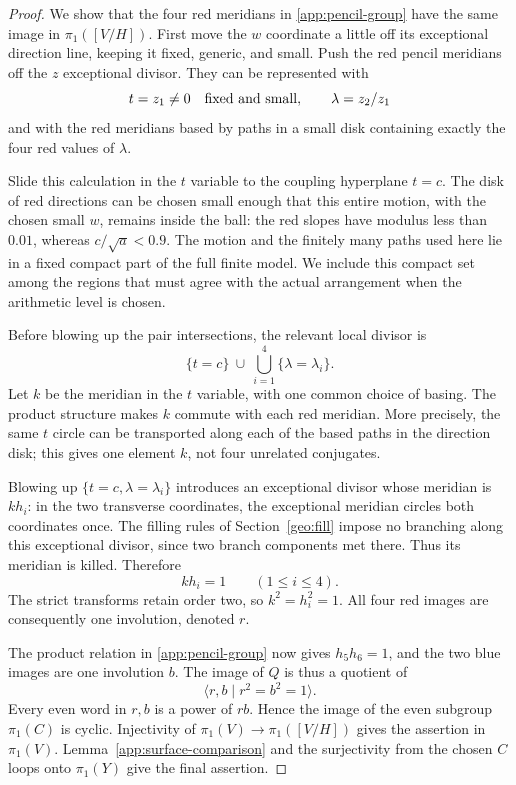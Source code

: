 \begin{proof}
We show that the four red meridians in \eqref{app:pencil-group} have
the same image in $\pi_1([V/H])$.  First move the $w$ coordinate a little
off its exceptional direction line, keeping it fixed, generic, and
small.  Push the red pencil meridians off the $z$ exceptional divisor.
They can be represented with
\[
 t=z_1\ne0\quad\hbox{fixed and small},\qquad
 \lambda=z_2/z_1
\]
and with the red meridians based by paths in a small disk containing
exactly the four red values of $\lambda$.

Slide this calculation in the $t$ variable to the coupling hyperplane
$t=c$.  The disk of red directions can be chosen small enough that
this entire motion, with the chosen small $w$, remains inside the
ball: the red slopes have modulus less than $0.01$, whereas
$c/\sqrt a<0.9$.  The motion and the finitely many paths used here lie
in a fixed compact part of the full finite model.  We include this
compact set among the regions that must agree with the actual
arrangement when the arithmetic level is chosen.

Before blowing up the pair intersections, the relevant local divisor
is
\[
 \{t=c\}\ \cup\ \bigcup_{i=1}^4\{\lambda=\lambda_i\}.
\]
Let $k$ be the meridian in the $t$ variable, with one common choice of
basing.  The product structure makes $k$ commute with each red
meridian.  More precisely, the same $t$ circle can be transported along
each of the based paths in the direction disk; this gives one element
$k$, not four unrelated conjugates.

Blowing up $\{t=c,\lambda=\lambda_i\}$ introduces an exceptional
divisor whose meridian is $kh_i$: in the two transverse coordinates,
the exceptional meridian circles both coordinates once.  The filling
rules of Section~\ref{geo:fill} impose no branching along this
exceptional divisor, since two branch components met there.  Thus its
meridian is killed.  Therefore
\[
 kh_i=1\qquad(1\le i\le4).
\]
The strict transforms retain order two, so $k^2=h_i^2=1$.  All four
red images are consequently one involution, denoted $r$.

The product relation in \eqref{app:pencil-group} now gives
$h_5h_6=1$, and the two blue images are one involution $b$.  The image
of $Q$ is thus a quotient of
\[
 \langle r,b\mid r^2=b^2=1\rangle.
\]
Every even word in $r,b$ is a power of $rb$.  Hence the image of the
even subgroup $\pi_1(C)$ is cyclic.  Injectivity of
$\pi_1(V)\to\pi_1([V/H])$ gives the assertion in $\pi_1(V)$.
Lemma~\ref{app:surface-comparison} and the surjectivity from the chosen
$C$ loops onto $\pi_1(Y)$ give the final assertion.
\end{proof}


